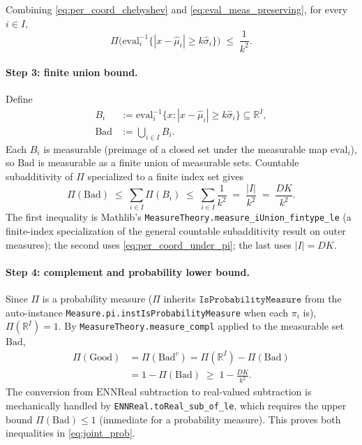 \documentclass[11pt]{article}
\theoremstyle{definition}
\theoremstyle{remark}
\begin{document}
Combining \eqref{eq:per_coord_chebyshev} and
\eqref{eq:eval_meas_preserving}, for every $i \in I$,
\begin{equation}
\Pi\bigl(\mathrm{eval}_i^{-1}\{|x - \hat\mu_i| \geq k\hat\sigma_i\}\bigr)
\;\leq\; \frac{1}{k^2}.
\label{eq:per_coord_under_pi}
\end{equation}

\paragraph{Step 3: finite union bound.}
Define
\begin{align*}
B_i &:= \mathrm{eval}_i^{-1}\{x : |x - \hat\mu_i| \geq k\hat\sigma_i\}
       \subseteq \mathbb{R}^I, \\
\mathrm{Bad} &:= \bigcup_{i \in I} B_i.
\end{align*}
Each $B_i$ is measurable (preimage of a closed set under the
measurable map $\mathrm{eval}_i$), so $\mathrm{Bad}$ is measurable
as a finite union of measurable sets. Countable subadditivity of
$\Pi$ specialized to a finite index set gives
\begin{equation}
\Pi(\mathrm{Bad}) \;\leq\; \sum_{i \in I} \Pi(B_i)
\;\leq\; \sum_{i \in I} \frac{1}{k^2}
\;=\; \frac{|I|}{k^2}
\;=\; \frac{DK}{k^2}.
\label{eq:union_bound}
\end{equation}
The first inequality is Mathlib's
\texttt{MeasureTheory.measure\_iUnion\_fintype\_le} (a finite-index
specialization of the general countable subadditivity result on
outer measures); the second uses \eqref{eq:per_coord_under_pi}; the
last uses $|I| = DK$.

\paragraph{Step 4: complement and probability lower bound.}
Since $\Pi$ is a probability measure ($\Pi$ inherits
$\mathtt{IsProbabilityMeasure}$ from the auto-instance
\texttt{Measure.pi.instIsProbabilityMeasure} when each $\pi_i$ is),
$\Pi(\mathbb{R}^I) = 1$. By
\texttt{MeasureTheory.measure\_compl} applied to the measurable set
$\mathrm{Bad}$,
\begin{align*}
\Pi(\mathrm{Good})
  &= \Pi(\mathrm{Bad}^c)
  = \Pi(\mathbb{R}^I) - \Pi(\mathrm{Bad}) \\
  &= 1 - \Pi(\mathrm{Bad})
  \;\geq\; 1 - \frac{DK}{k^2}.
\end{align*}
The conversion from $\mathrm{ENNReal}$ subtraction to real-valued
subtraction is mechanically handled by
\texttt{ENNReal.toReal\_sub\_of\_le}, which requires the upper
bound $\Pi(\mathrm{Bad}) \leq 1$ (immediate for a probability
measure). This proves both inequalities in \eqref{eq:joint_prob}.
\end{document}
